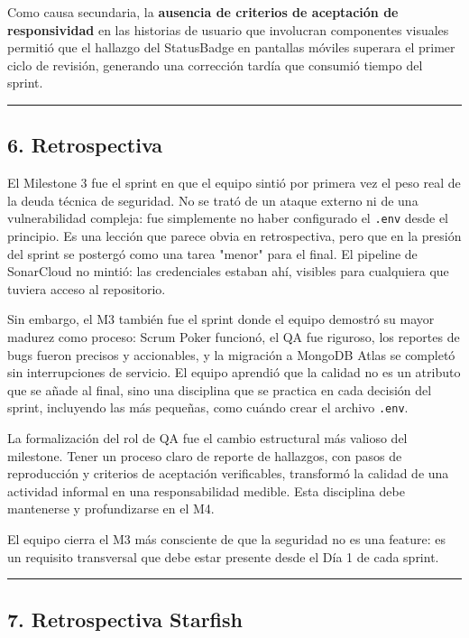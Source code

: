 \documentclass[11pt,a4paper]{article}
\begin{document}
Como causa secundaria, la \textbf{ausencia de criterios de aceptación de responsividad} en las historias de usuario que involucran componentes visuales permitió que el hallazgo del StatusBadge en pantallas móviles superara el primer ciclo de revisión, generando una corrección tardía que consumió tiempo del sprint.

\vspace{0.6em}\hrule\vspace{0.8em}

\subsection{6. Retrospectiva}

El Milestone 3 fue el sprint en que el equipo sintió por primera vez el peso real de la deuda técnica de seguridad. No se trató de un ataque externo ni de una vulnerabilidad compleja: fue simplemente no haber configurado el \texttt{.env} desde el principio. Es una lección que parece obvia en retrospectiva, pero que en la presión del sprint se postergó como una tarea "menor" para el final. El pipeline de SonarCloud no mintió: las credenciales estaban ahí, visibles para cualquiera que tuviera acceso al repositorio.

Sin embargo, el M3 también fue el sprint donde el equipo demostró su mayor madurez como proceso: Scrum Poker funcionó, el QA fue riguroso, los reportes de bugs fueron precisos y accionables, y la migración a MongoDB Atlas se completó sin interrupciones de servicio. El equipo aprendió que la calidad no es un atributo que se añade al final, sino una disciplina que se practica en cada decisión del sprint, incluyendo las más pequeñas, como cuándo crear el archivo \texttt{.env}.

La formalización del rol de QA fue el cambio estructural más valioso del milestone. Tener un proceso claro de reporte de hallazgos, con pasos de reproducción y criterios de aceptación verificables, transformó la calidad de una actividad informal en una responsabilidad medible. Esta disciplina debe mantenerse y profundizarse en el M4.

El equipo cierra el M3 más consciente de que la seguridad no es una feature: es un requisito transversal que debe estar presente desde el Día 1 de cada sprint.

\vspace{0.6em}\hrule\vspace{0.8em}

\subsection{7. Retrospectiva Starfish}
\end{document}
